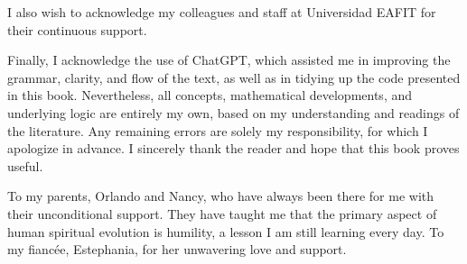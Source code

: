 I also wish to acknowledge my colleagues and staff at Universidad EAFIT for their continuous support.  

Finally, I acknowledge the use of ChatGPT, which assisted me in improving the grammar, clarity, and flow of the text, as well as in tidying up the code presented in this book. Nevertheless, all concepts, mathematical developments, and underlying logic are entirely my own, based on my understanding and readings of the literature. Any remaining errors are solely my responsibility, for which I apologize in advance. I sincerely thank the reader and hope that this book proves useful.  

To my parents, Orlando and Nancy, who have always been there for me with their unconditional support. They have taught me that the primary aspect of human spiritual evolution is humility, a lesson I am still learning every day. To my fiancée, Estephania, for her unwavering love and support.






